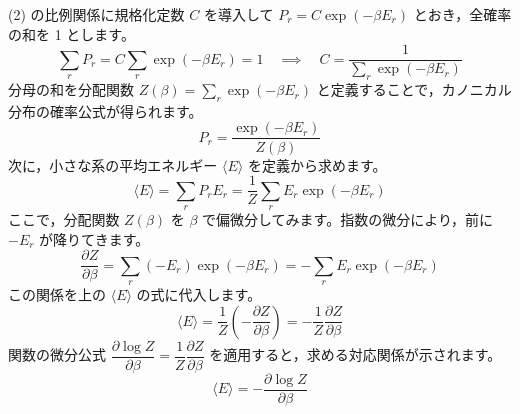 \begin{solutionparts}
(2) の比例関係に規格化定数 $C$ を導入して $P_r = C \exp(-\beta E_r)$ とおき，全確率の和を 1 とします。
\begin{equation*}
\sum_r P_r = C \sum_r \exp(-\beta E_r) = 1 \quad \implies \quad C = \frac{1}{\sum_r \exp(-\beta E_r)}
\end{equation*}
分母の和を分配関数 $Z(\beta) = \sum_r \exp(-\beta E_r)$ と定義することで，カノニカル分布の確率公式が得られます。
\begin{equation*}
P_r = \frac{\exp(-\beta E_r)}{Z(\beta)}
\end{equation*}
次に，小さな系の平均エネルギー $\langle E \rangle$ を定義から求めます。
\begin{equation*}
\langle E \rangle = \sum_r P_r E_r = \frac{1}{Z} \sum_r E_r \exp(-\beta E_r)
\end{equation*}
ここで，分配関数 $Z(\beta)$ を $\beta$ で偏微分してみます。指数の微分により，前に $-E_r$ が降りてきます。
\begin{equation*}
\frac{\partial Z}{\partial \beta} = \sum_r (-E_r) \exp(-\beta E_r) = - \sum_r E_r \exp(-\beta E_r)
\end{equation*}
この関係を上の $\langle E \rangle$ の式に代入します。
\begin{equation*}
\langle E \rangle = \frac{1}{Z} \left( -\frac{\partial Z}{\partial \beta} \right) = - \frac{1}{Z} \frac{\partial Z}{\partial \beta}
\end{equation*}
関数の微分公式 $\dfrac{\partial \log Z}{\partial \beta} = \dfrac{1}{Z} \dfrac{\partial Z}{\partial \beta}$ を適用すると，求める対応関係が示されます。
\begin{equation*}
\langle E \rangle = -\frac{\partial \log Z}{\partial \beta}
\end{equation*}

\end{solutionparts}
